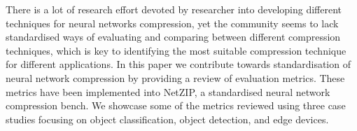 There is a lot of research effort devoted by researcher  into developing different techniques for neural networks compression, yet the community seems to lack standardised ways of evaluating and comparing between different compression techniques, which is key to identifying the most suitable compression technique for different applications.
%
In this paper we contribute towards standardisation of neural network compression by providing a review of evaluation metrics. These metrics have been implemented into NetZIP, a standardised neural network compression bench.
%
We showcase some of the metrics reviewed
using three case studies focusing on object classification, object detection, and edge devices.